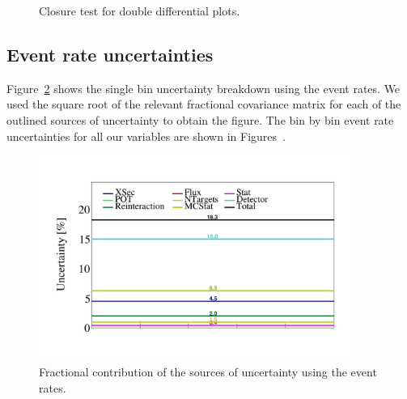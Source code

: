 \documentclass{article}
\begin{document}
\begin{figure}
    \caption{Closure test for double differential plots.}
    \label{fig:closure-test-double-diff}
\end{figure}

\clearpage 

\subsection{Event rate uncertainties}

Figure~\ref{fig:single-bin-uncertainties-event-rates} shows the single bin uncertainty breakdown 
using the event rates. We used the square root of the relevant fractional covariance matrix for 
each of the outlined sources of uncertainty to obtain the figure.
The bin by bin event rate uncertainties for all our variables are shown in 
Figures~.

\begin{figure}[H]
    \centering 
    \includegraphics[width=4in]{../Figs/CAFAna/BinUncertainties/EventCount.png}
    \caption{Fractional contribution of the sources of uncertainty using the event rates.}
    \label{fig:single-bin-uncertainties-event-rates}
\end{figure}
\end{document}
